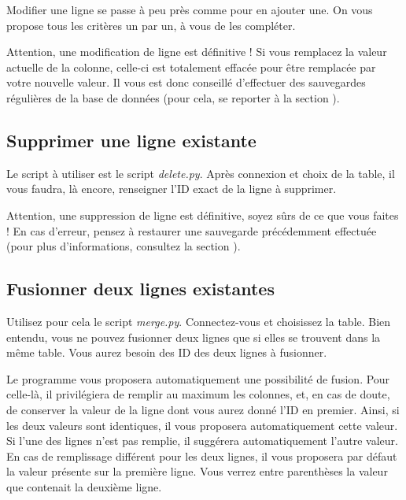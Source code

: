 \documentclass[12pt,a4paper]{article}
\begin{document}
        Modifier une ligne se passe à peu près comme pour en ajouter une. On vous propose tous les critères
        un par un, à vous de les compléter.

        Attention, une modification de ligne est définitive ! Si vous remplacez la valeur actuelle de la colonne,
        celle-ci est totalement effacée pour être remplacée par votre nouvelle valeur.
        Il vous est donc conseillé d'effectuer des sauvegardes régulières de la base de données
        (pour cela, se reporter à la section ).


    \bigskip
    \subsection{Supprimer une ligne existante}\label{suppressionligne}

        Le script à utiliser est le script \emph{delete.py}.
        Après connexion et choix de la table, il vous faudra, là encore, renseigner l'ID exact de la ligne
        à supprimer.

        Attention, une suppression de ligne est définitive, soyez sûrs de ce que vous faites !
        En cas d'erreur, pensez à restaurer une sauvegarde précédemment effectuée
        (pour plus d'informations, consultez la section ).


    \bigskip
    \subsection{Fusionner deux lignes existantes}\label{fusionligne}

        Utilisez pour cela le script \emph{merge.py}.
        Connectez-vous et choisissez la table. Bien entendu, vous ne pouvez fusionner deux lignes
        que si elles se trouvent dans la même table. Vous aurez besoin des ID des deux lignes à fusionner.

        Le programme vous proposera automatiquement une possibilité de fusion. Pour celle-là, il privilégiera
        de remplir au maximum les colonnes, et, en cas de doute, de conserver la valeur de la ligne dont vous
        aurez donné l'ID en premier.
        Ainsi, si les deux valeurs sont identiques, il vous proposera automatiquement cette valeur. Si l'une
        des lignes n'est pas remplie, il suggérera automatiquement l'autre valeur. En cas de remplissage différent
        pour les deux lignes, il vous proposera par défaut la valeur présente sur la première ligne. Vous verrez
        entre parenthèses la valeur que contenait la deuxième ligne.
\end{document}
